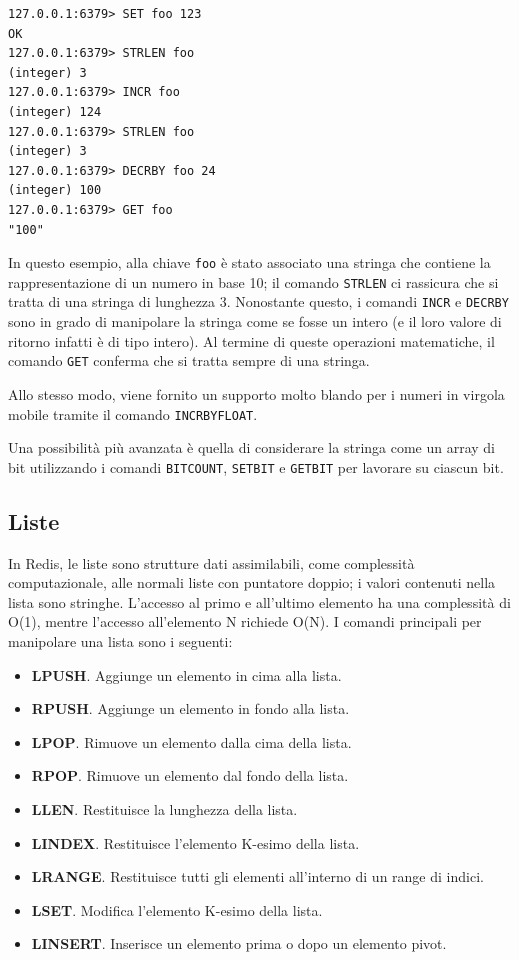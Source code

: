 \medskip
\begin{lstlisting}
127.0.0.1:6379> SET foo 123
OK
127.0.0.1:6379> STRLEN foo
(integer) 3
127.0.0.1:6379> INCR foo
(integer) 124
127.0.0.1:6379> STRLEN foo
(integer) 3
127.0.0.1:6379> DECRBY foo 24
(integer) 100
127.0.0.1:6379> GET foo
"100"
\end{lstlisting}

In questo esempio, alla chiave \verb|foo| è stato associato una stringa che contiene
la rappresentazione di un numero in base 10; il comando \verb|STRLEN| ci rassicura
che si tratta di una stringa di lunghezza 3. Nonostante questo, i comandi \verb|INCR|
e \verb|DECRBY| sono in grado di manipolare la stringa come se fosse un intero (e il
loro valore di ritorno infatti è di tipo intero). Al termine di queste operazioni
matematiche, il comando \verb|GET| conferma che si tratta sempre di una stringa.

Allo stesso modo, viene fornito un supporto molto blando per i numeri in virgola
mobile tramite il comando \verb|INCRBYFLOAT|.

Una possibilità più avanzata è quella di considerare la stringa come un array di bit
utilizzando i comandi \verb|BITCOUNT|, \verb|SETBIT| e \verb|GETBIT| per lavorare
su ciascun bit.

\subsection{Liste}

In Redis, le liste sono strutture dati assimilabili, come complessità computazionale,
alle normali liste con puntatore doppio; i valori contenuti nella lista sono stringhe.
L'accesso al primo e all'ultimo elemento ha una complessità di O(1), mentre
l'accesso all'elemento N richiede O(N). I comandi principali per manipolare una
lista sono i seguenti:

\begin{itemize}
	\medskip
	\item \textbf{LPUSH}. Aggiunge un elemento in cima alla lista.
	\item \textbf{RPUSH}. Aggiunge un elemento in fondo alla lista.
	\item \textbf{LPOP}. Rimuove un elemento dalla cima della lista.
	\item \textbf{RPOP}. Rimuove un elemento dal fondo della lista.
	\item \textbf{LLEN}. Restituisce la lunghezza della lista.
	\item \textbf{LINDEX}. Restituisce l'elemento K-esimo della lista.
	\item \textbf{LRANGE}. Restituisce tutti gli elementi all'interno di un range di indici.
	\item \textbf{LSET}. Modifica l'elemento K-esimo della lista.
	\item \textbf{LINSERT}. Inserisce un elemento prima o dopo un elemento pivot.
\end{itemize}

